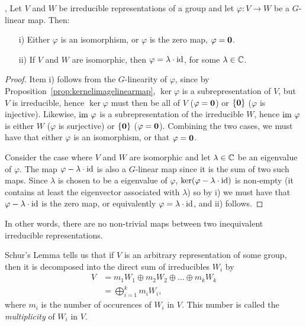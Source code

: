 \begin{theorem}\cite[Lemma.1.7.]{FultonHarris}, \cite[Prop.2.4.]{Serre}\label{thm:schur}
	Let $V$ and $W$ be irreducible representations of a group and let $\varphi: V \rightarrow W$ be a $G$-linear map. Then:
	\begin{itemize}
		\item[i)] Either $\varphi$ is an isomorphism, or $\varphi$ is the zero map, $\varphi = \mathbf{0}$.
		\item[ii)] If $V$ and $W$ are isomorphic, then $\varphi = \lambda \cdot \text{id}$, for some $\lambda \in \mathbb{C}$.
	\end{itemize}
\end{theorem}
\begin{proof}
	Item i) follows from the $G$-linearity of $\varphi$, since by Proposition~\ref{prop:kernelimagelinearmap}, $\ker \varphi$ is a subrepresentation of $V$, but $V$ is irreducible, hence $\ker \varphi$ must then be all of $V$ ($\varphi = \mathbf{0}$) or $\{\mathbf{0}\}$ ($\varphi$ is injective). Likewise, $\text{im } \varphi$ is a subrepresentation of the irreducible $W$, hence $\text{im } \varphi$ is either $W$ ($\varphi$ is surjective) or $\{\mathbf{0}\}$ ($\varphi = \mathbf{0}$). Combining the two cases, we must have that either $\varphi$ is an isomorphism, or that $\varphi = \mathbf{0}$.
	
	Consider the case where $V$ and $W$ are isomorphic and let $\lambda \in \mathbb{C}$ be an eigenvalue of $\varphi$. The map $\varphi - \lambda \cdot \text{id}$ is also a $G$-linear map since it is the sum of two such maps. Since $\lambda$ is chosen to be a eigenvalue of $\varphi$, $\ker(\varphi - \lambda \cdot \text{id})$ is non-empty (it contains at least the eigenvector associated with $\lambda$) so by i) we must have that $\varphi - \lambda \cdot \text{id}$ is the zero map, or equivalently $\varphi = \lambda \cdot \text{id}$, and ii) follows.
\end{proof}

In other words, there are no non-trivial maps between two inequivalent irreducible representations. %


	Schur's Lemma tells us that if $V$ is an arbitrary representation of some group, then it is decomposed into the direct sum of irreducibles $W_i$ by
	\begin{align*}
		V &= m_1 W_1 \oplus m_2 W_2 \oplus \dots \oplus m_k W_k \\
		&= \bigoplus_{i=1}^k m_i W_i,
	\end{align*}
	where $m_i$ is the number of occurences of $W_i$ in $V$. This number is called the \textit{multiplicity} of $W_i$ in $V$.

